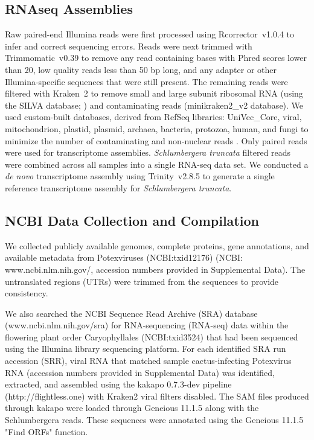 \documentclass[fleqn,10pt,lineno]{wlpeerj}
\begin{document}
\subsection*{RNAseq Assemblies}

Raw paired-end Illumina reads were first processed using \mbox{Rcorrector}~v1.0.4 \citep{song2015} to infer and correct sequencing errors.
Reads were next trimmed with \mbox{Trimmomatic}~v0.39 \citep{bolger2014} to remove any read containing bases with Phred scores lower than 20, low quality reads less than 50 bp long, and any adapter or other Illumina-specific sequences that were still present.
The remaining reads were filtered with \mbox{Kraken}~2 \citep{wood2019} to remove small and large subunit ribosomal RNA (using the SILVA database; \citealt{quast2013}) and contaminating reads (minikraken2\_v2 database).
We used custom-built databases, derived from RefSeq libraries: UniVec\_Core, viral, mitochondrion, plastid, plasmid, archaea, bacteria, protozoa, human, and fungi to minimize the number of contaminating and non-nuclear reads \citep{ramanauskas2021}.
Only paired reads were used for transcriptome assemblies.
\textit{Schlumbergera truncata} filtered reads were combined across all samples into a single RNA-seq data set.
We conducted a \textit{de novo} transcriptome assembly using \mbox{Trinity}~v2.8.5 \citep{grabherr2011} 
to generate a single reference transcriptome assembly for \textit{Schlumbergera truncata}.

\subsection*{NCBI Data Collection and Compilation}
We collected publicly available genomes, complete proteins, gene annotations, and available metadata from Potexviruses (NCBI:txid12176) (NCBI: www.ncbi.nlm.nih.gov/, accession numbers provided in Supplemental Data). 
The untranslated regions (UTRs) were trimmed from the sequences to provide consistency.


We also searched the NCBI Sequence Read Archive (SRA) database (www.ncbi.nlm.nih.gov/sra) for RNA-sequencing (RNA-seq) data within the flowering plant order Caryophyllales (NCBI:txid3524) that had been sequenced using the Illumina library sequencing platform. 
For each identified SRA run accession (SRR), viral RNA that matched sample cactus-infecting Potexvirus RNA (accession numbers provided in Supplemental Data) was identified, extracted, and assembled using the kakapo 0.7.3-dev pipeline (http://flightless.one) with Kraken2 viral filters disabled. 
The SAM files produced through kakapo were loaded through Geneious 11.1.5 along with the Schlumbergera reads.
These sequences were annotated using the Geneious 11.1.5 "Find ORFs" function. 
\end{document}
